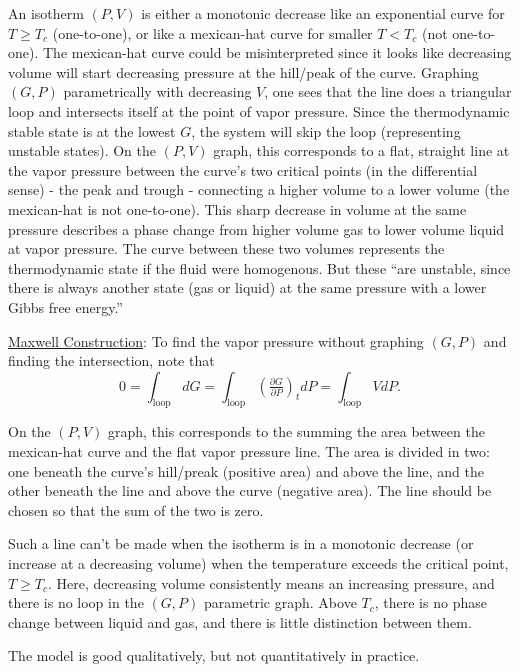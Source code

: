 \documentclass[12pt]{article}
\begin{document}
\begin{minipage}[t]{.56\textwidth}
    \setlength{\parindent}{.5cm}
    \scriptsize
    An isotherm \((P,V)\) is either a monotonic decrease like an exponential curve for \(T \geq T_c\) (one-to-one), 
    or like a mexican-hat curve for smaller \(T < T_c\) (not one-to-one). The mexican-hat curve could be misinterpreted
    since it looks like decreasing volume will start decreasing pressure at the hill/peak of the curve. Graphing 
    \((G,P)\) parametrically with decreasing \(V\), one sees that the line does a triangular loop and intersects itself 
    at the point of vapor pressure. Since the thermodynamic stable state is at the lowest \(G\), the system will skip 
    the loop (representing unstable states). On the \((P,V)\) graph, this corresponds to a flat, straight line at the 
    vapor pressure between the curve's two critical points (in the differential sense) - the peak and trough - 
    connecting a higher volume to a lower volume (the mexican-hat is not one-to-one). This sharp decrease in volume at 
    the same pressure describes a phase change from higher volume gas to lower volume liquid at vapor pressure. The 
    curve between these two volumes represents the thermodynamic state if the fluid were homogenous. But these ``are
    unstable, since there is always another state (gas or liquid) at the same pressure with a lower Gibbs
    free energy.''

    \vspace{10pt}

    \underline{Maxwell Construction}:
    To find the vapor pressure without graphing \((G,P)\) and finding the intersection, note that
    \[0 = \int_\text{loop} dG = \int_\text{loop} \left( \tfrac{\partial G}{\partial P} \right)_t dP
        = \int_\text{loop} V dP.\] 
\end{minipage}

\vspace{15pt}
{\scriptsize \noindent
On the \((P,V)\) graph, this corresponds to the summing the area between the 
mexican-hat curve and the flat vapor pressure line. The area is divided in two: one beneath the curve's hill/preak 
(positive area) and above the line, and the other beneath the line and above the curve (negative area). The line
should be chosen so that the sum of the two is zero. 

\vspace{5pt}

Such a line can't be made when the isotherm is in a monotonic decrease (or increase at a decreasing volume) when 
the temperature exceeds the critical point, \(T \geq T_c\). Here, decreasing volume consistently means an 
increasing pressure, and there is no loop in the \((G,P)\) parametric graph. Above \(T_c\), there is no phase 
change between liquid and gas, and there is little distinction between them.

\vspace{5pt}

The model is good qualitatively, but not quantitatively in practice.

}
\end{document}

